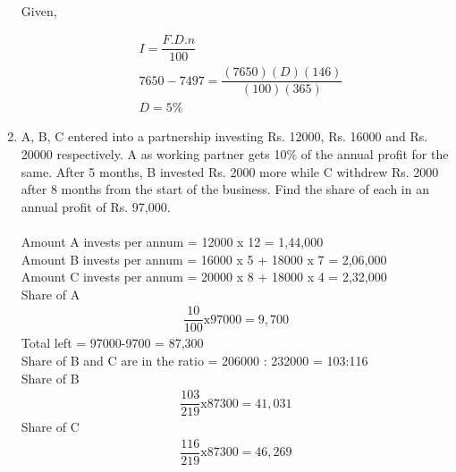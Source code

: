 \documentclass[journal,12pt,twocolumn]{IEEEtran}
\renewcommand\thesection{\arabic{section}}
\begin{document}
\begin{enumerate}[label=\thesection.\arabic*.,ref=\thesection.\theenumi]
 \solution\\
 Given,
\begin{table}[ht]
 \centering
 \caption{}
 \end{table}
 \begin{align}
& I= \dfrac{F.D.n}{100}\\
 &7650-7497 = \dfrac{(7650)(D)(146)}{(100)(365)}\\
 &D = 5\%
 \end{align}
 \item A, B, C entered into a partnership investing Rs. 12000, Rs. 16000 and
Rs. 20000 respectively. A as working partner gets 10\% of the annual profit for
the same. After 5 months, B invested Rs. 2000 more while C withdrew Rs. 2000
after 8 months from the start of the business. Find the share of each in an
annual profit of Rs. 97,000.\\
\solution\\
Amount A invests per annum = 12000 x 12 = 1,44,000\\
Amount B invests per annum = 16000 x 5 + 18000 x 7 = 2,06,000\\
Amount C invests per annum = 20000 x 8 + 18000 x 4 = 2,32,000\\
Share of A \begin{align}\dfrac{10}{100}\text{x}97000 = 9,700\end{align}
Total left = 97000-9700 = 87,300\\
Share of B and C are in the ratio = 206000 : 232000 = 103:116\\
Share of B \begin{align}\dfrac{103}{219}\text{x}87300 = 41,031\end{align}
Share of C  \begin{align}\dfrac{116}{219}\text{x}87300 = 46,269\end{align}


\end{enumerate}
\end{document}
